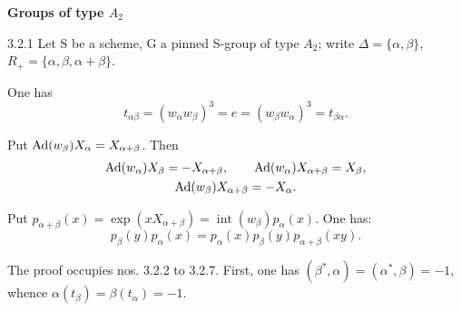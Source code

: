 \textbf{Groups of type $A_2$}
\begin{proposition}{3.2.1}\label{XXIII.3.2.1}
Let S be a scheme, G a pinned S-group of type $A_2$; write $\Delta=\{\alpha,\beta\}$, $R_+=\{\alpha,\beta,\alpha+\beta\}$.
\begin{enumeratei}
\item One has
\[
t_{\alpha\beta}=(w_\alpha w_\beta)^3=e=(w_\beta w_\alpha)^3=t_{\beta\alpha}.
\]
\item Put $\operatorname{Ad}(w_\beta)X_\alpha=X_{\alpha+\beta}$. Then
\[
\begin{gathered}
\operatorname{Ad}(w_\alpha)X_\beta=-X_{\alpha+\beta},\qquad\operatorname{Ad}(w_\alpha)X_{\alpha+\beta}=X_\beta,\\
\operatorname{Ad}(w_\beta)X_{\alpha+\beta}=-X_\alpha.
\end{gathered}
\]
\item Put $p_{\alpha+\beta}(x)=\exp(xX_{\alpha+\beta})=\operatorname{int}(w_\beta)p_\alpha(x)$. One has:
\[
p_\beta(y)p_\alpha(x)=p_\alpha(x)p_\beta(y)p_{\alpha+\beta}(xy).
\]
\end{enumeratei}
\end{proposition}
The proof occupies nos. 3.2.2 to 3.2.7. First, one has $(\beta^*,\alpha)=(\alpha^*,\beta)=-1$, whence $\alpha(t_\beta)=\beta(t_\alpha)=-1$.

